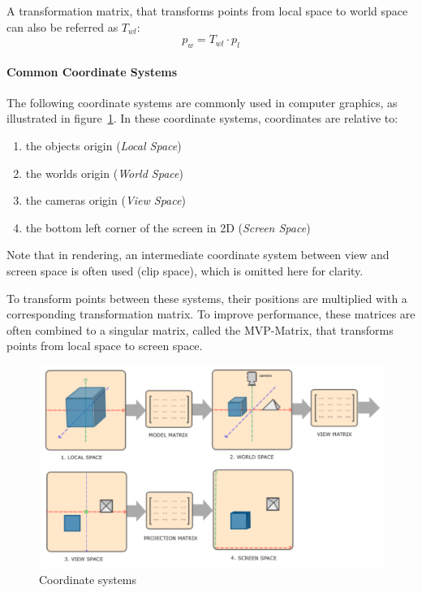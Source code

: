 A transformation matrix, that transforms points from local space to world space can also be referred as $T_{wl}$:
\begin{equation}
    p_w = T_{wl} \cdot p_l
\end{equation}

\paragraph{Common Coordinate Systems}\label{sec:coordinate-systems}
The following coordinate systems are commonly used in computer graphics, as illustrated in figure~\ref{fig:coordinate-systems}.
In these coordinate systems, coordinates are relative to:
\begin{enumerate}
    \item the objects origin (\textit{Local Space})
    \item the worlds origin (\textit{World Space})
    \item the cameras origin (\textit{View Space})
    \item the bottom left corner of the screen in 2D (\textit{Screen Space})
\end{enumerate}
Note that in rendering, an intermediate coordinate system between view and screen space is often used (clip space),
which is omitted here for clarity.

To transform points between these systems, their positions are multiplied with a corresponding transformation matrix.
To improve performance, these matrices are often combined to a singular matrix, called the MVP-Matrix,
that transforms points from local space to screen space. \cite{de_vries_learn_2020}

\begin{figure}[h!]
    \centering
    \includegraphics[width=0.85\linewidth]{images/coordinateSystemsAdjusted}
    \caption{Coordinate systems}
    \label{fig:coordinate-systems}
\end{figure}

